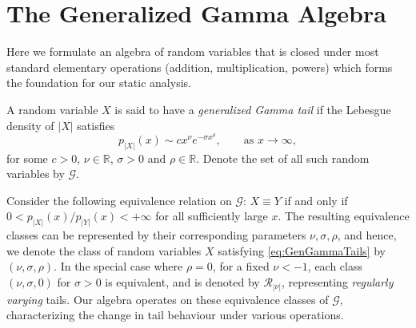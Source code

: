 \documentclass[thesis.tex]{subfiles}
\begin{document}
\section{The Generalized Gamma Algebra}\label{sec:gga}

Here we formulate an algebra of random variables that is closed under most standard elementary operations (addition, multiplication, powers) which forms the foundation for our static analysis.

\begin{definition}\label{def:gg_tail}
A random variable $X$ is said to have a \emph{generalized Gamma tail} if the Lebesgue density of $|X|$ satisfies
\begin{equation}
\label{eq:GenGammaTails}
p_{|X|}(x) \sim c x^\nu e^{-\sigma x^\rho}, \qquad \text{as } x \to \infty,
\end{equation}
for some $c > 0$, $\nu \in \mathbb{R}$, $\sigma > 0$ and $\rho \in \mathbb{R}$. Denote the set of all such random variables by $\mathcal{G}$.
\end{definition}
Consider the following equivalence relation on $\mathcal{G}$: $X \equiv Y$ if and only if $0 < p_{|X|}(x) / p_{|Y|}(x) < +\infty$ for all sufficiently large $x$. The resulting equivalence classes can be represented by their corresponding parameters $\nu, \sigma, \rho$, and hence, we denote the class of random variables $X$ satisfying \cref{eq:GenGammaTails} by $(\nu,\sigma,\rho)$. In the special case where $\rho = 0$, for a fixed $\nu < -1$, each class $(\nu,\sigma,0)$ for $\sigma > 0$ is equivalent, and is denoted by $\mathcal{R}_{|\nu|}$, representing \emph{regularly varying} tails. Our algebra operates on these equivalence classes of $\mathcal{G}$, characterizing the change in tail behaviour under various operations.
\end{document}
